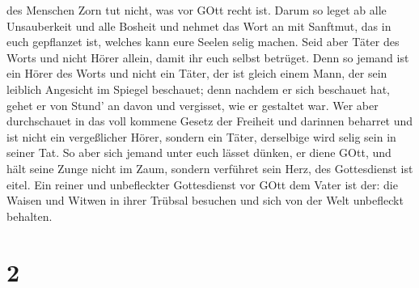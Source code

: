 des Menschen Zorn tut nicht, was vor GOtt recht ist.  Darum
so leget ab alle Unsauberkeit und alle Bosheit und nehmet das Wort an
mit Sanftmut, das in euch gepflanzet ist, welches kann eure Seelen selig
machen.  Seid aber Täter des Worts und nicht Hörer allein,
damit ihr euch selbst betrüget.  Denn so jemand ist ein
Hörer des Worts und nicht ein Täter, der ist gleich einem Mann, der sein
leiblich Angesicht im Spiegel beschauet;  denn nachdem er
sich beschauet hat, gehet er von Stund' an davon und vergisset, wie er
gestaltet war.  Wer aber durchschauet in das voll kommene
Gesetz der Freiheit und darinnen beharret und ist nicht ein vergeßlicher
Hörer, sondern ein Täter, derselbige wird selig sein in seiner Tat.
 So aber sich jemand unter euch lässet dünken, er diene
GOtt, und hält seine Zunge nicht im Zaum, sondern verführet sein Herz,
des Gottesdienst ist eitel.  Ein reiner und unbefleckter
Gottesdienst vor GOtt dem Vater ist der: die Waisen und Witwen in ihrer
Trübsal besuchen und sich von der Welt unbefleckt behalten.

\hypertarget{section-1}{%
\section{2}\label{section-1}}

